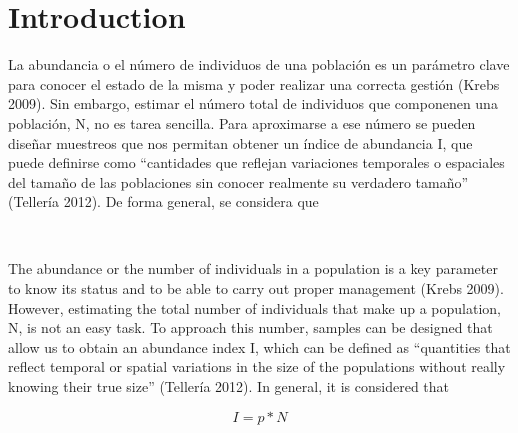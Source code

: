 \documentclass[
]{book}
\begin{document}
\hypertarget{intro}{%
\chapter{Introduction}\label{intro}}

\begin{col}{0.45\textwidth}
La abundancia o el número de individuos de una población es un parámetro clave para conocer el estado de la misma y poder realizar una correcta gestión (Krebs 2009). Sin embargo, estimar el número total de individuos que componenen una población, N, no es tarea sencilla. Para aproximarse a ese número se pueden diseñar muestreos que nos permitan obtener un índice de abundancia I, que puede definirse como ``cantidades que reflejan variaciones temporales o espaciales del tamaño de las poblaciones sin conocer realmente su verdadero tamaño'' (Tellería 2012). De forma general, se considera que

\end{col}

\begin{col}{0.05\textwidth}
~

\end{col}

\begin{col}{0.45\textwidth}
The abundance or the number of individuals in a population is a key parameter to know its status and to be able to carry out proper management (Krebs 2009). However, estimating the total number of individuals that make up a population, N, is not an easy task. To approach this number, samples can be designed that allow us to obtain an abundance index I, which can be defined as ``quantities that reflect temporal or spatial variations in the size of the populations without really knowing their true size'' (Tellería 2012). In general, it is considered that

\end{col}

\[ I = p * N \]
\end{document}
